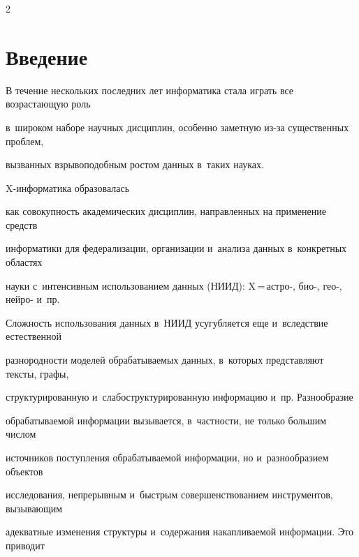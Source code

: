 





\thispagestyle{headings}



\begin{multicols}{2}



\label{st\stat}



\section{Введение}





  В течение нескольких последних лет информатика стала играть все возрастающую роль

в~широком наборе научных дисциплин, особенно заметную из-за существенных проблем,

вызванных взрывоподобным ростом данных в~таких науках.\linebreak

 X-информатика образовалась

как совокупность академических дисциплин, направленных на применение средств

информатики для федерализации, организации и~анализа данных в~конкретных областях

науки с~интенсивным использованием данных (НИИД): X\,=\,астро-, био-, гео-, нейро- и~пр.



  Сложность использования данных в~НИИД усугубляется еще и~вследствие естественной

разнородности моделей обрабатываемых данных, в~которых представляют тексты, графы,

структурированную и~слабоструктурированную информацию и~пр. Разнообразие

обрабатываемой информации вызывается, в~частности, не только большим числом

источников поступления обрабатываемой информации, но и~разнообразием объектов

исследования, непрерывным и~быстрым совершенствованием инструментов, вызывающим

адекватные изменения структуры и~содержания накапливаемой информации. Это приводит


\end{multicols}
